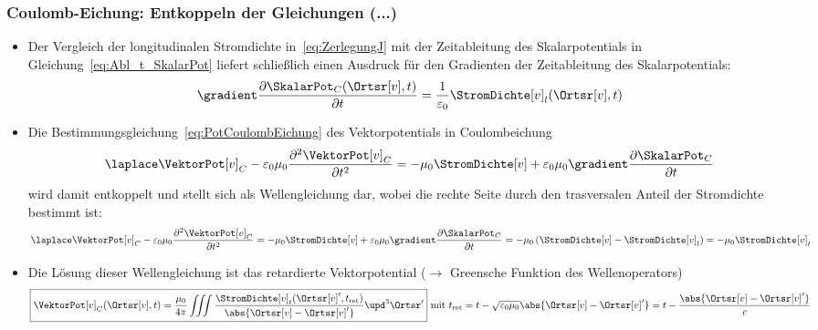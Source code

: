     \begin{frame}
  \frametitle{Coulomb-Eichung: Entkoppeln der Gleichungen (...)}
  \begin{itemize}[<+->]
  \item Der Vergleich der longitudinalen Stromdichte in~\eqref{eq:ZerlegungJ} mit der Zeitableitung des Skalarpotentials in Gleichung~\eqref{eq:Abl_t_SkalarPot} liefert schließlich einen Ausdruck für den Gradienten der Zeitableitung des Skalarpotentials:
    \begin{equation}
      \gradient \frac{\partial \SkalarPot_C (\Ortsr[v], t)}{\partial t} = \frac{1}{\varepsilon_0} \StromDichte[v]_l (\Ortsr[v], t)
    \end{equation}
  \item Die Bestimmungsgleichung~\eqref{eq:PotCoulombEichung} des Vektorpotentials in Coulombeichung
    \begin{equation*}
      \laplace\VektorPot[v]_C -\varepsilon_0 \mu_0\frac{\partial^2\VektorPot[v]_C}{\partial t^2} = -\mu_0\StromDichte[v] +\varepsilon_0\mu_0 \gradient\frac{\partial\SkalarPot_C}{\partial t}
    \end{equation*}
    wird damit entkoppelt und stellt sich als Wellengleichung dar, wobei die rechte Seite durch den trasversalen Anteil der Stromdichte bestimmt ist:
    \begin{equation}
      \laplace\VektorPot[v]_C -\varepsilon_0 \mu_0\frac{\partial^2\VektorPot[v]_C}{\partial t^2} = -\mu_0\StromDichte[v] +\varepsilon_0\mu_0 \gradient\frac{\partial\SkalarPot_C}{\partial t} = -\mu_0\left( \StromDichte[v] - \StromDichte[v]_l\right) = -\mu_0 \StromDichte[v]_t
    \end{equation}
  \item Die Lösung dieser Wellengleichung ist das \alert{retardierte Vektorpotential} ($\to$ Greensche Funktion des Wellenoperators)
    \begin{equation}
     \boxed{ \VektorPot[v]_C(\Ortsr[v], t) = \frac{\mu_0}{4\pi} \iiint \frac{\StromDichte[v]_t (\Ortsr[v]^\prime, t_{\text{ret}})}{\abs{\Ortsr[v]-\Ortsr[v]^\prime}} \upd^3\Ortsr^\prime} \text{ mit } t_{\text{ret}} = t - \sqrt{\varepsilon_0\mu_0} \abs{\Ortsr[v]-\Ortsr[v]^\prime} = t - \frac{\abs{\Ortsr[v]-\Ortsr[v]^\prime}}{c}
      \end{equation}
      \end{itemize}
  \end{frame}

